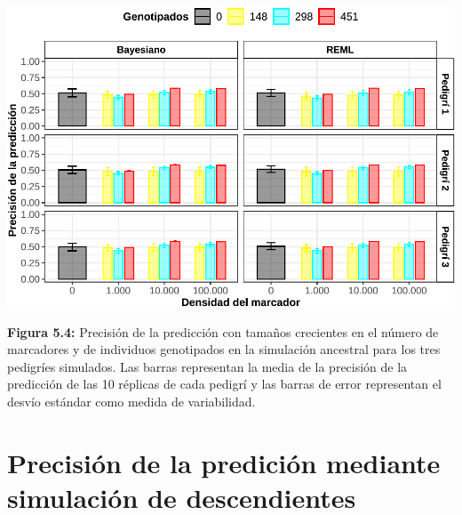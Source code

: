 \documentclass[11pt,spanish,a4paper,oneside,]{book} %
\begin{document}
\begin{center}\includegraphics[width=1\linewidth]{figures/Cor_Bay_Pen_2} \end{center}

\noindent
\textbf{Figura 5.4:} Precisión de la predicción con tamaños crecientes en el número de marcadores y de individuos genotipados en la simulación ancestral para los tres pedigríes simulados. Las barras representan la media de la precisión de la predicción de las 10 réplicas de cada pedigrí y las barras de error representan el desvío estándar como medida de variabilidad.

\hypertarget{precisiuxf3n-de-la-prediciuxf3n-mediante-simulaciuxf3n-de-descendientes-1}{%
\section{Precisión de la predición mediante simulación de descendientes}\label{precisiuxf3n-de-la-prediciuxf3n-mediante-simulaciuxf3n-de-descendientes-1}}

\hspace*{1em}
\end{document}
